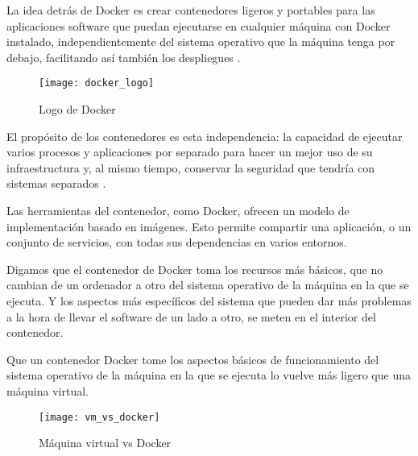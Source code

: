 La idea detrás de Docker es crear contenedores ligeros y portables para las aplicaciones software que puedan ejecutarse en cualquier máquina con Docker instalado, independientemente del sistema operativo que la máquina tenga por debajo, facilitando así también los despliegues \cite{docker4}.

\begin{figure}[htp!]
  \centering
  \texttt{[image: docker\_logo]}
  \caption{Logo de Docker}
  \label{fig:docker_logo}
\end{figure}

El propósito de los contenedores es esta independencia: la capacidad de ejecutar varios procesos y aplicaciones por separado para hacer un mejor uso de su infraestructura y, al mismo tiempo, conservar la seguridad que tendría con sistemas separados \cite{docker5}.

Las herramientas del contenedor, como Docker, ofrecen un modelo de implementación basado en imágenes. Esto permite compartir una aplicación, o un conjunto de servicios, con todas sus dependencias en varios entornos.

Digamos que el contenedor de Docker toma los recursos más básicos, que no cambian de un ordenador a otro del sistema operativo de la máquina en la que se ejecuta. Y los aspectos más específicos del sistema que pueden dar más problemas a la hora de llevar el software de un lado a otro, se meten en el interior del contenedor.

Que un contenedor Docker tome los aspectos básicos de funcionamiento del sistema operativo de la máquina en la que se ejecuta lo vuelve más ligero que una máquina virtual.

\begin{figure}[htp!]
  \centering
  \texttt{[image: vm\_vs\_docker]}
  \caption{Máquina virtual vs Docker}
  \label{fig:vm_vs_docker}
\end{figure}
